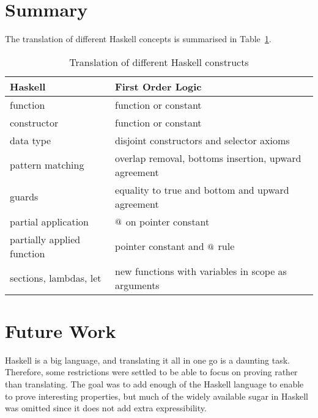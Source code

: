 \section{Summary}

The translation of different Haskell concepts is summarised in
Table~\ref{tab:transtable}.

\begin{table}[h]
  \centering
  \begin{tabular}{|l|l|}
    \hline
    Haskell                    & First Order Logic \\
    \hline
    function                   & function or constant \\
    constructor                & function or constant \\
    data type                  & disjoint constructors and selector axioms \\
    pattern matching           & overlap removal, bottoms insertion, upward agreement \\
    guards                     & equality to true and bottom and upward agreement \\
    partial application        & $@$ on pointer constant \\
    partially applied function & pointer constant and $@$ rule \\
    sections, lambdas, let     & new functions with variables in scope as arguments \\
    \hline
  \end{tabular}
  \caption{Translation of different Haskell constructs
    \label{tab:transtable}
  }
\end{table}

%






\section{Future Work}

Haskell is a big language, and translating it all in one go is a
daunting task. Therefore, some restrictions were settled to be able to
focus on proving rather than translating.  The goal was to add enough
of the Haskell language to enable to prove interesting properties, but
much of the widely available sugar in Haskell was omitted since it
does not add extra expressibility.


